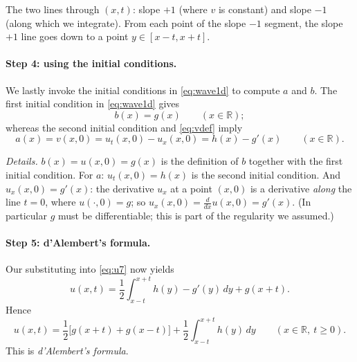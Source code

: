 \documentclass[11pt]{article}
\theoremstyle{plain}
\theoremstyle{definition}
\theoremstyle{remark}
\begin{document}
\begin{center}

\small The two lines through $(x,t)$: slope $+1$ (where $v$ is constant) and slope $-1$ (along which we integrate). From each point of the slope $-1$ segment, the slope $+1$ line goes down to a point $y \in [x - t, x + t]$.
\end{center}

\paragraph{Step 4: using the initial conditions.} We lastly invoke the initial conditions in \eqref{eq:wave1d} to compute $a$ and $b$. The first initial condition in \eqref{eq:wave1d} gives
$$ b(x) = g(x) \qquad (x \in \mathbb{R}); $$
whereas the second initial condition and \eqref{eq:vdef} imply
$$ a(x) = v(x,0) = u_t(x,0) - u_x(x,0) = h(x) - g'(x) \qquad (x \in \mathbb{R}). $$

\emph{Details.} $b(x) = u(x,0) = g(x)$ is the definition of $b$ together with the first initial condition. For $a$: $u_t(x,0) = h(x)$ is the second initial condition. And $u_x(x,0) = g'(x)$: the derivative $u_x$ at a point $(x,0)$ is a derivative \emph{along} the line $t = 0$, where $u(\cdot,0) = g$; so $u_x(x,0) = \frac{d}{dx}u(x,0) = g'(x)$. (In particular $g$ must be differentiable; this is part of the regularity we assumed.)

\paragraph{Step 5: d'Alembert's formula.} Our substituting into \eqref{eq:u7} now yields
$$ u(x,t) = \frac12\int_{x-t}^{x+t} h(y) - g'(y)\, dy + g(x + t). $$
Hence
\begin{equation}\label{eq:dalembert}
u(x,t) = \frac12\big[g(x + t) + g(x - t)\big] + \frac12\int_{x-t}^{x+t} h(y)\, dy \qquad (x \in \mathbb{R},\ t \geq 0).
\end{equation}
This is \emph{d'Alembert's formula}.
\end{document}
